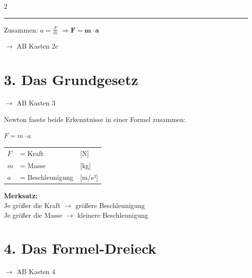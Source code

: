 \documentclass[11pt, a4paper]{article}
\newcommand{\einheit}[1]{\textcolor{mittelgrau}{[#1]}}
\begin{document}
\begin{multicols}{2}
\begin{definitionsbox}
\vspace{0.2em}
\hrule
\vspace{0.2em}
Zusammen: $a = \frac{F}{m}$ \enspace$\Rightarrow$\enspace $\mathbf{F = m \cdot a}$
\end{definitionsbox}
{\small\textcolor{mittelgrau}{$\rightarrow$ AB Kasten 2c}}

\columnbreak


\section*{\textcolor{fachfarbe}{3. Das Grundgesetz}}
{\small\textcolor{mittelgrau}{$\rightarrow$ AB Kasten 3}}

Newton fasste beide Erkenntnisse in einer Formel zusammen:

\begin{formelbox}
\begin{center}
{\Huge $F = m \cdot a$}

\vspace{0.6em}
\begin{tabular}{lll}
$F$ & = Kraft & \einheit{N} \\[0.3em]
$m$ & = Masse & \einheit{kg} \\[0.3em]
$a$ & = Beschleunigung & \einheit{m/s²}
\end{tabular}
\end{center}
\end{formelbox}

\begin{merksatzbox}
\textbf{Merksatz:}\\
Je größer die Kraft $\rightarrow$ größere Beschleunigung\\
Je größer die Masse $\rightarrow$ kleinere Beschleunigung
\end{merksatzbox}


\section*{\textcolor{fachfarbe}{4. Das Formel-Dreieck}}
{\small\textcolor{mittelgrau}{$\rightarrow$ AB Kasten 4}}


\end{multicols}
\end{document}
